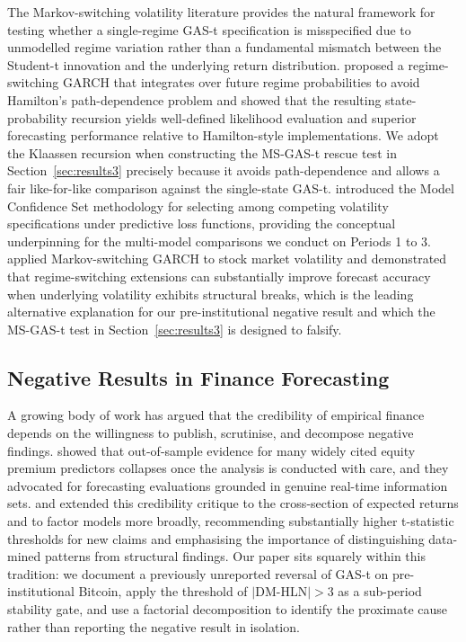 The Markov-switching volatility literature provides the natural framework for testing whether a single-regime GAS-t specification is misspecified due to unmodelled regime variation rather than a fundamental mismatch between the Student-t innovation and the underlying return distribution. \citet{klaassen2002} proposed a regime-switching GARCH that integrates over future regime probabilities to avoid Hamilton's path-dependence problem and showed that the resulting state-probability recursion yields well-defined likelihood evaluation and superior forecasting performance relative to Hamilton-style implementations. We adopt the Klaassen recursion when constructing the MS-GAS-t rescue test in Section~\ref{sec:results3} precisely because it avoids path-dependence and allows a fair like-for-like comparison against the single-state GAS-t. \citet{hansen2003} introduced the Model Confidence Set methodology for selecting among competing volatility specifications under predictive loss functions, providing the conceptual underpinning for the multi-model comparisons we conduct on Periods 1 to 3. \citet{marcucci2005} applied Markov-switching GARCH to stock market volatility and demonstrated that regime-switching extensions can substantially improve forecast accuracy when underlying volatility exhibits structural breaks, which is the leading alternative explanation for our pre-institutional negative result and which the MS-GAS-t test in Section~\ref{sec:results3} is designed to falsify.

\subsection{Negative Results in Finance Forecasting}

A growing body of work has argued that the credibility of empirical finance depends on the willingness to publish, scrutinise, and decompose negative findings. \citet{welch2008} showed that out-of-sample evidence for many widely cited equity premium predictors collapses once the analysis is conducted with care, and they advocated for forecasting evaluations grounded in genuine real-time information sets. \citet{harvey2016} and \citet{harvey2017} extended this credibility critique to the cross-section of expected returns and to factor models more broadly, recommending substantially higher t-statistic thresholds for new claims and emphasising the importance of distinguishing data-mined patterns from structural findings. Our paper sits squarely within this tradition: we document a previously unreported reversal of GAS-t on pre-institutional Bitcoin, apply the \citet{harvey2016} threshold of $|\text{DM-HLN}| > 3$ as a sub-period stability gate, and use a factorial decomposition to identify the proximate cause rather than reporting the negative result in isolation.

